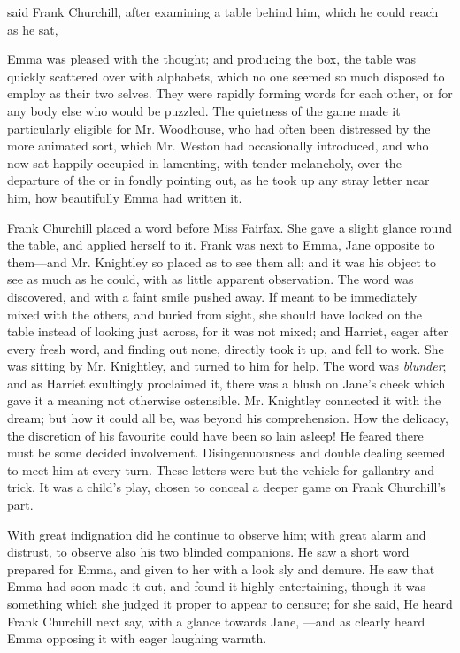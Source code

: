  said Frank Churchill, after examining a table behind him, which he could reach as he sat, 

Emma was pleased with the thought; and producing the box, the table was quickly scattered over with alphabets, which no one seemed so much disposed to employ as their two selves. They were rapidly forming words for each other, or for any body else who would be puzzled. The quietness of the game made it particularly eligible for Mr. Woodhouse, who had often been distressed by the more animated sort, which Mr. Weston had occasionally introduced, and who now sat happily occupied in lamenting, with tender melancholy, over the departure of the  or in fondly pointing out, as he took up any stray letter near him, how beautifully Emma had written it.

Frank Churchill placed a word before Miss Fairfax. She gave a slight glance round the table, and applied herself to it. Frank was next to Emma, Jane opposite to them---and Mr. Knightley so placed as to see them all; and it was his object to see as much as he could, with as little apparent observation. The word was discovered, and with a faint smile pushed away. If meant to be immediately mixed with the others, and buried from sight, she should have looked on the table instead of looking just across, for it was not mixed; and Harriet, eager after every fresh word, and finding out none, directly took it up, and fell to work. She was sitting by Mr. Knightley, and turned to him for help. The word was {\em blunder}; and as Harriet exultingly proclaimed it, there was a blush on Jane's cheek which gave it a meaning not otherwise ostensible. Mr. Knightley connected it with the dream; but how it could all be, was beyond his comprehension. How the delicacy, the discretion of his favourite could have been so lain asleep! He feared there must be some decided involvement. Disingenuousness and double dealing seemed to meet him at every turn. These letters were but the vehicle for gallantry and trick. It was a child's play, chosen to conceal a deeper game on Frank Churchill's part.

With great indignation did he continue to observe him; with great alarm and distrust, to observe also his two blinded companions. He saw a short word prepared for Emma, and given to her with a look sly and demure. He saw that Emma had soon made it out, and found it highly entertaining, though it was something which she judged it proper to appear to censure; for she said,  He heard Frank Churchill next say, with a glance towards Jane, ---and as clearly heard Emma opposing it with eager laughing warmth. 

